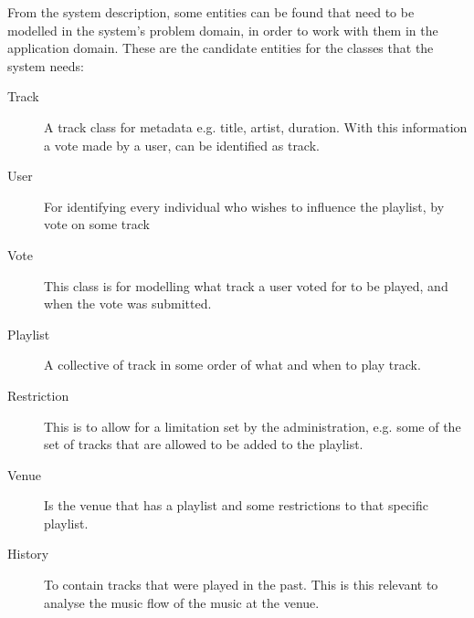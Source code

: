 From the system description, some entities can be found that need to be modelled in the system's problem domain, in order to work with them in the application domain. These are the candidate entities for the classes that the system needs:
\begin{description}
    \item[Track]
    A track class for metadata e.g. title, artist, duration. With this information a vote made by a user, can be identified as track.
    \item[User]
    For identifying every individual who wishes to influence the playlist, by vote on some track
    \item[Vote]
    This class is for modelling what track a user voted for to be played, and when the vote was submitted.
    \item[Playlist]
    A collective of track in some order of what and when to play track.
    \item[Restriction]
    This is to allow for a limitation set by the administration, e.g. some of the set of tracks that are allowed to be added to the playlist.
    \item[Venue]
    Is the venue that has a playlist and some restrictions to that specific playlist.
    \item[History]
    To contain tracks that were played in the past. This is this
    relevant to analyse the music flow of the music at the venue.
\end{description}
